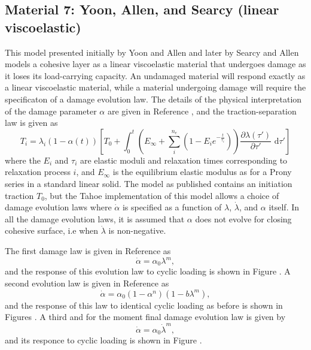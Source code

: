 \subsection{Material 7: Yoon, Allen, and Searcy (linear viscoelastic)}
\label{sect.material.surface.yoon}
This model presented initially by Yoon and Allen and later by
Searcy and Allen models a cohesive layer as a linear viscoelastic material
that undergoes damage as it loses its load-carrying capacity. An undamaged
material will respond exactly as a linear viscoelastic material, while
a material undergoing damage will require the specificaton of a 
damage evolution law. The details of the physical interpretation of 
the damage parameter $\alpha$ are given in Reference \cite{Allen1999}, and 
the traction-separation law is given as
\begin{equation}
T_i = \lambda_i (1-\alpha(t))\left[ T_0 + \int_0^t \left( E_\infty + \sum_i^{n_e} (1-E_i 
e^{-\frac{t}{\tau_i}})\right) \frac{\partial \lambda(\tau')}{\partial \tau'} \mbox{ d}
\tau' \right]
\end{equation}
where the $E_i$ and $\tau_i$ are elastic moduli and relaxation times
corresponding to relaxation process $i$, and $E_\infty$ is the equilibrium
elastic modulus as for a Prony series in a standard linear solid. 
The model as published contains an initiation traction $T_0$, but the 
Tahoe implementation of this model allows a choice of
damage evolution laws where $\dot{\alpha}$ is specified as a function
of $\lambda$, $\dot{\lambda}$, and $\alpha$ itself. In all the damage
evolution laws, it is assumed that $\alpha$ does not evolve for closing
cohesive surface, i.e when $\dot{\lambda}$ is non-negative. 

The first damage law is given in Reference \cite{Allen2001} as
\begin{equation}
\dot{\alpha} = \alpha_0 \lambda^m,
\end{equation}
and the response of this evolution law to cyclic loading is shown 
in Figure . A second evolution law is given in Reference \cite{Allen1999} as
\begin{equation}
\dot{\alpha} = \alpha_0 (1-\alpha^n) (1- b \lambda^m),
\end{equation}
and the response of this law to identical cyclic loading as before
is shown in Figures .
A third and for the moment final damage evolution law is given by
\begin{equation}
\dot{\alpha} = \alpha_0 \dot{\lambda}^m,
\end{equation}
and its responce to cyclic loading is shown in Figure .

